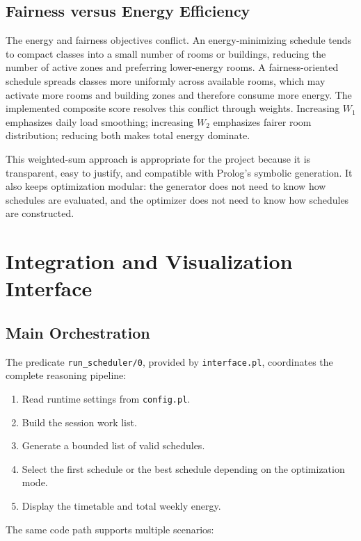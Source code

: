 \documentclass[12pt,a4paper]{article}
\newcommand{\predicate}[1]{\texttt{#1}}
\begin{document}
\subsection{Fairness versus Energy Efficiency}

The energy and fairness objectives conflict. An energy-minimizing schedule tends to compact classes into a small number of rooms or buildings, reducing the number of active zones and preferring lower-energy rooms. A fairness-oriented schedule spreads classes more uniformly across available rooms, which may activate more rooms and building zones and therefore consume more energy. The implemented composite score resolves this conflict through weights. Increasing \(W_1\) emphasizes daily load smoothing; increasing \(W_2\) emphasizes fairer room distribution; reducing both makes total energy dominate.

This weighted-sum approach is appropriate for the project because it is transparent, easy to justify, and compatible with Prolog's symbolic generation. It also keeps optimization modular: the generator does not need to know how schedules are evaluated, and the optimizer does not need to know how schedules are constructed.

\section{Integration and Visualization Interface}

\subsection{Main Orchestration}

The predicate \predicate{run\_scheduler/0}, provided by \predicate{interface.pl}, coordinates the complete reasoning pipeline:

\begin{enumerate}
    \item Read runtime settings from \predicate{config.pl}.
    \item Build the session work list.
    \item Generate a bounded list of valid schedules.
    \item Select the first schedule or the best schedule depending on the optimization mode.
    \item Display the timetable and total weekly energy.
\end{enumerate}

The same code path supports multiple scenarios:
\end{document}
